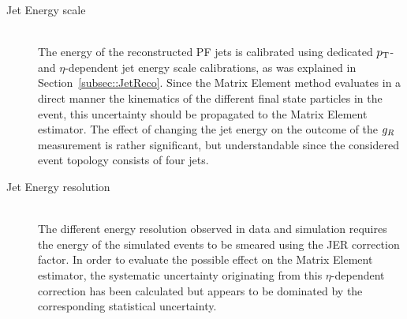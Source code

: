 \begin{myindentpar}
\begin{description}
    \item[Jet Energy scale] \hfill \\
    The energy of the reconstructed PF jets is calibrated using dedicated $p_{\rm T}$- and $\eta$-dependent jet energy scale calibrations, as was explained in Section~\ref{subsec::JetReco}.
    Since the Matrix Element method evaluates in a direct manner the kinematics of the different final state particles in the event, this uncertainty should be propagated to the Matrix Element estimator.
    The effect of changing the jet energy on the outcome of the $g_{R}$ measurement is rather significant, but understandable since the considered event topology consists of four jets.
    
    
    \item[Jet Energy resolution] \hfill \\
    The different energy resolution observed in data and simulation requires the energy of the simulated events to be smeared using the JER correction factor.
    In order to evaluate the possible effect on the Matrix Element estimator, the systematic uncertainty originating from this $\eta$-dependent correction has been calculated but appears to be dominated by the corresponding statistical uncertainty.     
    

\end{description}
\end{myindentpar}
